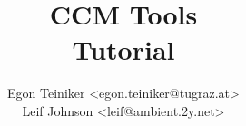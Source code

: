 \documentclass{report}
\title{{\Huge CCM Tools}\\Tutorial}
\author{
  Egon Teiniker <egon.teiniker@tugraz.at>\\
  Leif Johnson <leif@ambient.2y.net>\\
}
\begin{document}
\maketitle
{}
\tableofcontents
\listoffigures

\newpage
{}
\setlength{\parskip}{0.5cm}






\begin{appendix}


\end{appendix}



\end{document}
